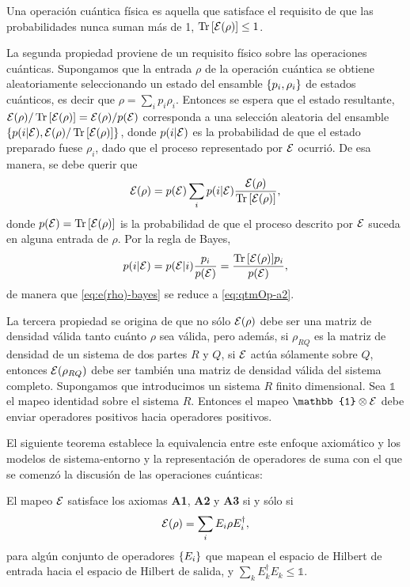 Una operación cuántica física es aquella que satisface el 
requisito de que las probabilidades nunca suman más de 1,
$\Tr \qty[\mathcal{E} (\rho)]\leq 1$.

La segunda propiedad proviene de un requisito físico sobre las
operaciones cuánticas. Supongamos que la entrada $\rho$ de la 
operación cuántica se obtiene aleatoriamente seleccionando un 
estado del ensamble $\qty{ p_i,\rho_i}$ de estados cuánticos, 
es decir que $\rho = \sum_i p_i\rho_i$. Entonces se espera que
el estado resultante, $\mathcal{E} (\rho)/\Tr \qty[\mathcal{E} (\rho)] =
\mathcal{E} (\rho)/p\qty(\mathcal{E})$ corresponda a una selección aleatoria del
ensamble $\qty{p\qty(i\vert\mathcal{E}), \mathcal{E}(\rho)/\Tr \qty[\mathcal{E}(\rho)]}$,
donde $p\qty(i\vert\mathcal{E})$ es la probabilidad de que el estado
preparado fuese $\rho_i$, dado que el proceso representado por
$\mathcal{E}$ ocurrió. De esa manera, se debe querir que
\begin{align}
	\mathcal{E} (\rho) = p\qty(\mathcal{E})\sum _i p\qty(i\vert \mathcal{E})\frac{\mathcal{E} (\rho)}
	{\Tr \qty[\mathcal{E} (\rho)]},
	\label{eq:e(rho)-bayes}
\end{align}
donde $p\qty(\mathcal{E})=\Tr \qty[\mathcal{E} (\rho)]$ is la probabilidad de que 
el proceso descrito por $\mathcal{E}$ suceda en alguna entrada de $\rho$.
Por la regla de Bayes,
\begin{align}
	p\qty(i\vert \mathcal{E})=p\qty(\mathcal{E} \vert i) \frac{p_i}{p\qty(\mathcal{E})}
	=\frac{\Tr \qty[\mathcal{E} (\rho)]p_i}{p\qty(\mathcal{E})},
\end{align}
de manera que \eqref{eq:e(rho)-bayes} se reduce a \eqref{eq:qtmOp-a2}.

La tercera propiedad se origina de que no sólo $\mathcal{E} (\rho)$ debe ser
una matriz de densidad válida tanto cuánto $\rho$ sea válida, pero 
además, si $\rho _{RQ}$ es la matriz de densidad de un sistema 
de dos partes $R$ y $Q$, si $\mathcal{E}$ actúa sólamente sobre $Q$, 
entonces $\mathcal{E}(\rho_{RQ})$ debe ser también una matriz de densidad 
válida del sistema completo. Supongamos que introducimos un sistema 
$R$ finito dimensional. Sea $\mathbb{1}$ el mapeo identidad sobre
el sistema $R$. Entonces el mapeo $\mathbb{1}\otimes \E$ debe
enviar operadores positivos hacia operadores positivos.

El siguiente teorema establece la equivalencia entre este enfoque 
axiomático y los modelos de sistema-entorno y la representación
de operadores de suma con el que se comenzó
la discusión de las operaciones cuánticas:
\begin{teorema}
	El mapeo $\mathcal{E}$ satisface los axiomas \textbf{A1}, \textbf{A2} y 
	\textbf{A3} si y sólo si
	\begin{align}
		\mathcal{E}(\rho) = \sum _i E_i\rho E_i^{\dagger},
	\end{align}
	para algún conjunto de operadores $\qty{E_i}$ que mapean el espacio
	de Hilbert de entrada hacia el espacio de Hilbert de salida, y
	$\sum _kE_k^{\dagger}E_k\leq \mathbb{1}$.
\end{teorema}


